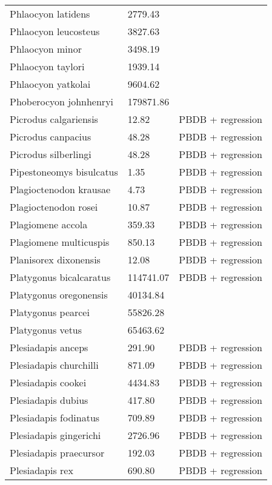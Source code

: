 \documentclass{article}
\begin{document}
\begin{center}
\begin{longtable}{p{} p{} p{}}
    Phlaocyon latidens & 2779.43 & \cite{Tomiya2013} \\ 
    Phlaocyon leucosteus & 3827.63 & \cite{Tomiya2013} \\ 
    Phlaocyon minor & 3498.19 & \cite{Tomiya2013} \\ 
    Phlaocyon taylori & 1939.14 & \cite{Tomiya2013} \\ 
    Phlaocyon yatkolai & 9604.62 & \cite{Tomiya2013} \\ 
    Phoberocyon johnhenryi & 179871.86 & \cite{Tomiya2013} \\ 
    Picrodus calgariensis & 12.82 & PBDB + regression \\ 
    Picrodus canpacius & 48.28 & PBDB + regression \\ 
    Picrodus silberlingi & 48.28 & PBDB + regression \\ 
    Pipestoneomys bisulcatus & 1.35 & PBDB + regression \\ 
    Plagioctenodon krausae & 4.73 & PBDB + regression \\ 
    Plagioctenodon rosei & 10.87 & PBDB + regression \\ 
    Plagiomene accola & 359.33 & PBDB + regression \\ 
    Plagiomene multicuspis & 850.13 & PBDB + regression \\ 
    Planisorex dixonensis & 12.08 & PBDB + regression \\ 
    Platygonus bicalcaratus & 114741.07 & PBDB + regression \\ 
    Platygonus oregonensis & 40134.84 & \cite{Tomiya2013} \\ 
    Platygonus pearcei & 55826.28 & \cite{Tomiya2013} \\ 
    Platygonus vetus & 65463.62 & \cite{Brook2004a} \\ 
    Plesiadapis anceps & 291.90 & PBDB + regression \\ 
    Plesiadapis churchilli & 871.09 & PBDB + regression \\ 
    Plesiadapis cookei & 4434.83 & PBDB + regression \\ 
    Plesiadapis dubius & 417.80 & PBDB + regression \\ 
    Plesiadapis fodinatus & 709.89 & PBDB + regression \\ 
    Plesiadapis gingerichi & 2726.96 & PBDB + regression \\ 
    Plesiadapis praecursor & 192.03 & PBDB + regression \\ 
    Plesiadapis rex & 690.80 & PBDB + regression \\ 

\end{longtable}
\end{center}
\end{document}
